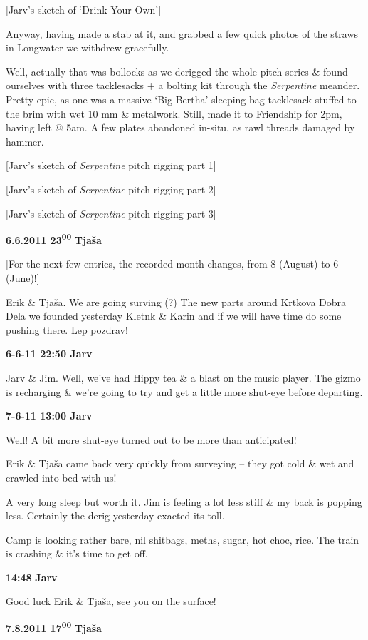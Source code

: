 {[}Jarv's sketch of `Drink Your Own'{]}

Anyway, having made a stab at it, and grabbed a few quick photos of the
straws in Longwater we withdrew gracefully.

Well, actually that was bollocks as we derigged the whole pitch series
\& found ourselves with three tacklesacks + a bolting kit through the
\emph{Serpentine} meander. Pretty epic, as one was a massive `Big
Bertha' sleeping bag tacklesack stuffed to the brim with wet 10 mm \&
metalwork. Still, made it to Friendship for 2pm, having left @ 5am. A
few plates abandoned in-situ, as rawl threads damaged by hammer.

{[}Jarv's sketch of \emph{Serpentine} pitch rigging part 1{]}

{[}Jarv's sketch of \emph{Serpentine} pitch rigging part 2{]}

{[}Jarv's sketch of \emph{Serpentine} pitch rigging part 3{]}

\textbf{6.6.2011 23\textsuperscript{00}} \textbf{Tjaša}

{[}For the next few entries, the recorded month changes, from 8 (August)
to 6 (June)!{]}

Erik \& Tjaša. We are going surving (?) The new parts around Krtkova
Dobra Dela we founded yesterday Kletnk \& Karin and if we will have time
do some pushing there. Lep pozdrav!

\textbf{6-6-11 22:50 Jarv}

Jarv \& Jim. Well, we've had Hippy tea \& a blast on the music player.
The gizmo is recharging \& we're going to try and get a little more
shut-eye before departing.

\textbf{7-6-11 13:00 Jarv}

Well! A bit more shut-eye turned out to be more than anticipated!

Erik \& Tjaša came back very quickly from surveying -- they got cold \&
wet and crawled into bed with us!

A very long sleep but worth it. Jim is feeling a lot less stiff \& my
back is popping less. Certainly the derig yesterday exacted its toll.

Camp is looking rather bare, nil shitbags, meths, sugar, hot choc, rice.
The train is crashing \& it's time to get off.

\textbf{14:48} \textbf{Jarv}

Good luck Erik \& Tjaša, see you on the surface!

\textbf{7.8.2011 17\textsuperscript{00}} \textbf{Tjaša}

